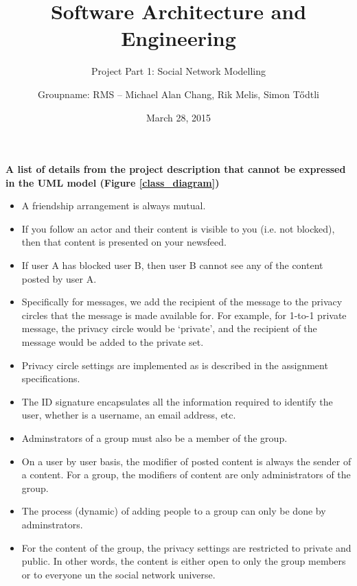 \documentclass[pdftex,12pt,a4paper]{scrartcl}
\title{Software Architecture and Engineering}
\subtitle{Project Part 1: Social Network Modelling}
\date{March 28, 2015}
\author{Groupname: RMS -- Michael Alan Chang, Rik Melis, Simon T{\H o}dtli}
\begin{document}
\maketitle

{\bf A list of details from the project description that cannot be expressed in the UML model (Figure \ref{class_diagram})}
\begin{itemize}
  \item A friendship arrangement is always mutual.
  \item If you follow an actor and their content is visible to you (i.e. not blocked), then that content is presented on your newsfeed.
  \item If user A has blocked user B, then user B cannot see any of the content posted by user A.
  \item Specifically for messages, we add the recipient of the message to the privacy circles that the message is made available for.  For example, for 1-to-1 private message, the privacy circle would be `private', and the recipient of the message would be added to the private set.
  \item Privacy circle settings are implemented as is described in the assignment specifications.
  \item The ID signature encapsulates all the information required to identify the user, whether is a username, an email address, etc.
  \item Adminstrators of a group must also be a member of the group.
  \item On a user by user basis, the modifier of posted content is always the sender of a content. For a group, the modifiers of content are only administrators of the group.
  \item The process (dynamic) of adding people to a group can only be done by adminstrators.
  \item For the content of the group, the privacy settings are restricted to private and public. In other words, the content is either open to only the group members or to everyone un the social network universe.
\end{itemize}
\end{document}
